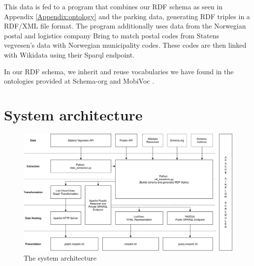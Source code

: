 \vspace{5mm}

This data is fed to a program that combines our RDF schema as seen in Appendix \ref{Appendix:ontology} and the parking data, generating RDF triples in a RDF/XML file format. The program additionally uses data from the Norwegian postal and logistics company Bring \cite{bring} to match postal codes from Statens vegvesen's data with Norwegian municipality codes. These codes are then linked with Wikidata \cite{wikidata} using their Sparql endpoint.

\vspace{5mm}

In our RDF schema, we inherit and reuse vocabularies we have found in the ontologies provided at Schema-org \cite{schema-org} and MobiVoc \cite{schema-mobivoc}.


\section{System architecture}

\begin{figure}[H]
	\centering
	\includegraphics[width=\linewidth]{figures/system-architecture.png}
	\caption{The system architecture}
\end{figure}



